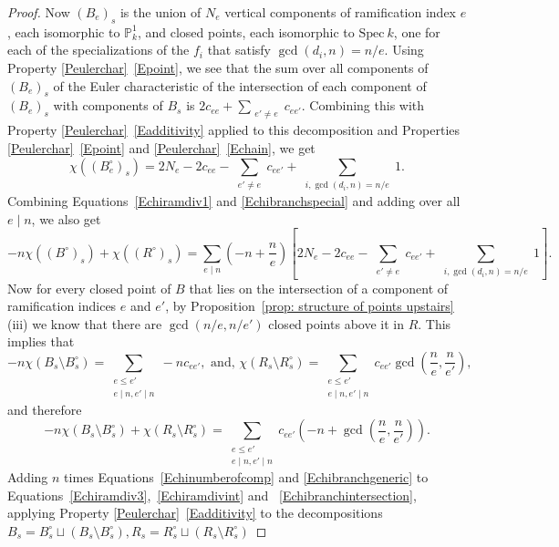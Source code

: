 \documentclass[12pt]{amsart}
\numberwithin{equation}{section}
\theoremstyle{definition}
\renewcommand{\P}{\mathbb P}
\newcommand{\Spec}{\mathrm{Spec} \ }
\begin{document}
\begin{proof}
Now  $(B_e)_s$ is the union of $N_e$ vertical components of
ramification index $e$, each isomorphic to $\P^1_k$, and closed
points, each isomorphic to $\Spec k$, one for each of the
specializations of the $f_i$ that satisfy $\gcd(d_i,n) = n/e$. Using
Property \ref{Peulerchar}~\ref{Epoint}, we see that the sum over all components
of $(B_e)_s$ of the Euler characteristic of the intersection of each
component of $(B_e)_s$ with components of $B_s$ is $2c_{ee}
+\sum_{\substack{e' \neq e}}  c_{ee'}$. Combining this with
Property \ref{Peulerchar}~\ref{Eadditivity} applied to this decomposition
and Properties \ref{Peulerchar}~\ref{Epoint} and
\ref{Peulerchar}~\ref{Echain}, we get
\begin{equation}\label{Echibranchspecial} \chi((B^\circ_e)_s) = 2N_e -2c_{ee} -\sum_{\substack{e' \neq e}}  c_{ee'} +\sum_{\substack{i,\gcd(d_i,n) = n/e}} 1.\end{equation}
Combining Equations~\eqref{Echiramdiv1} and \eqref{Echibranchspecial} and adding over all $e \mid n$, we also get
\begin{equation}\label{Echiramdivint}
 -n\chi((B^\circ)_s)+\chi((R^\circ)_s) = \sum_{e \mid n} \left(-n+ \frac{n}{e} \right) \left[ 2N_e -2c_{ee} -\sum_{\substack{e' \neq e}}  c_{ee'} +\sum_{\substack{i,\gcd(d_i,n) = n/e}} 1 \right].
\end{equation}
Now for every closed point of $B$ that lies on the intersection of a component of ramification indices $e$ and $e'$, by Proposition~\ref{prop: structure of points upstairs}(iii) we know that there are $\gcd(n/e,n/e')$ closed points above it in $R$. This implies that
\[ -n\chi(B_s \setminus B^\circ_s) = \sum_{\substack{e \leq e' \\ e \mid n, e' \mid n}} -nc_{ee'}, \text{ and, }\chi(R_s \setminus R^\circ_s) = \sum_{\substack{e \leq e' \\ e \mid n, e' \mid n}} c_{ee'} \gcd \left(\frac{n}{e},\frac{n}{e'} \right),\]
and therefore
\begin{equation}\label{Echibranchintersection}
 -n\chi(B_s \setminus B^\circ_s) + \chi(R_s \setminus R^\circ_s) = \sum_{\substack{e \leq e' \\ e \mid n, e' \mid n}} c_{ee'} \left( -n+\gcd \left(\frac{n}{e},\frac{n}{e'} \right) \right).
\end{equation}
Adding $n$ times Equations~\eqref{Echinumberofcomp} and \eqref{Echibranchgeneric} to Equations~\eqref{Echiramdiv3},~\eqref{Echiramdivint} and ~\eqref{Echibranchintersection}, applying Property \ref{Peulerchar}~\ref{Eadditivity} to the decompositions $B_s = B_s^\circ \sqcup (B_s \setminus B_s^{\circ}), R_s = R_s^\circ \sqcup (R_s \setminus R_s^{\circ})$

\end{proof}
\end{document}
